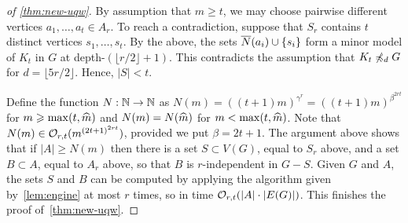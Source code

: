 \begin{proof}[of \cref{thm:new-uqw}]
By assumption that $m\ge t$, we may choose pairwise different vertices $a_1,\ldots,a_t\in A_r$.
To reach a contradiction, suppose that $S_r$ contains $t$ distinct vertices $s_1,\ldots,s_t$. 
By the above, the sets $\overline{N}(a_i)\cup\{s_i\}$ 
form a minor model of $K_t$ in $G$ at depth-$(\lfloor r/2\rfloor+1)$.
This contradicts the assumption that $K_t\not\preccurlyeq_d G$ for $d=\lfloor 5r/2 \rfloor$.
Hence, $|S|<t$.


Define the function  $N:\mathbb{N}\to\mathbb{N}$
as $N(m)=((t+1)m)^{\gamma^{r}}=((t+1)m)^{\beta^{2rt}}$
for $m\geqslant \max(t,\widehat{m})$  and $N(m)=N(\widehat{m})$ for $m<\max(t,\widehat{m})$.
Note that $N(m)\in \mathcal{O}_{r,t}{(m^{{(2t+1)}^{2rt}})}$, provided we put $\beta=2t+1$.
The argument above shows that if $|A|\ge N(m)$ then 
there is a set $S\subset V(G)$, equal to $S_r$ above,
and a set $B\subset A$, equal to $A_r$ above,
so that $B$ is $r$-independent in $G-S$.
Given $G$ and $A$, the sets $S$ and $B$ can be computed by applying the algorithm given by~\cref{lem:engine} at most $r$ times, so in time $\mathcal{O}_{r,t}(|A|\cdot |E(G)|)$.
This finishes the proof of~\cref{thm:new-uqw}.
\end{proof}


